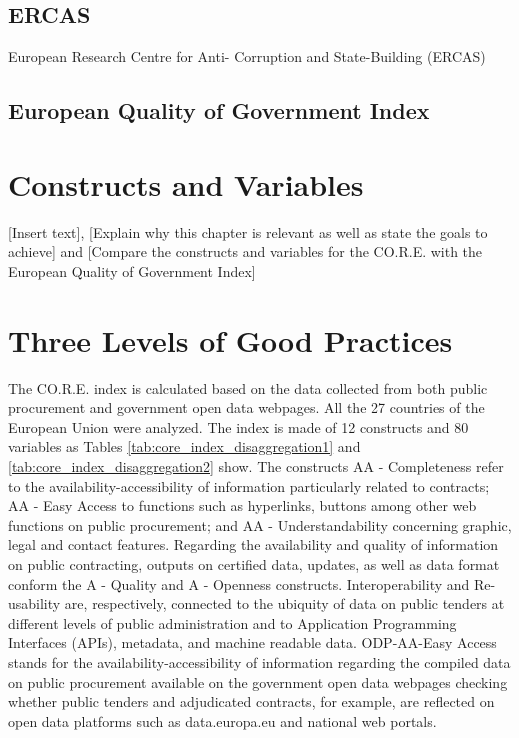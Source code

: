 \documentclass[a4paper, twoside]{report}
\begin{document}
\section*{ERCAS}


European Research Centre for Anti- Corruption and State-Building (ERCAS) 

\section*{European Quality of Government Index}





\clearpage

\chapter{Constructs and Variables}

[Insert text], [Explain why this chapter is relevant as well as state the goals to achieve] and [Compare the constructs and variables for the CO.R.E. with the European Quality of Government Index]

\clearpage

\chapter{Three Levels of Good Practices}
\label{three_levels_good_practices_chapter}

The CO.R.E. index is calculated based on the data collected from both public procurement and government open data webpages. All the 27 countries of the European Union were analyzed. The index is made of 12 constructs and 80 variables as Tables \ref{tab:core_index_disaggregation1} and \ref{tab:core_index_disaggregation2} show. The constructs AA - Completeness refer to the availability-accessibility of information particularly related to contracts; AA - Easy Access to functions such as hyperlinks, buttons among other web functions on public procurement; and AA - Understandability concerning graphic, legal and contact features. Regarding the availability and quality of information on public contracting, outputs on certified data, updates, as well as data format conform the A - Quality and A - Openness constructs. Interoperability and Re-usability are, respectively, connected to the ubiquity of data on public tenders at different levels of public administration and to Application Programming Interfaces (APIs), metadata, and machine readable data. ODP-AA-Easy Access stands for the availability-accessibility of information regarding the compiled data on public procurement available on the government open data webpages checking whether public tenders and adjudicated contracts, for example, are reflected on open data platforms such as data.europa.eu and national web portals.\\
\end{document}
